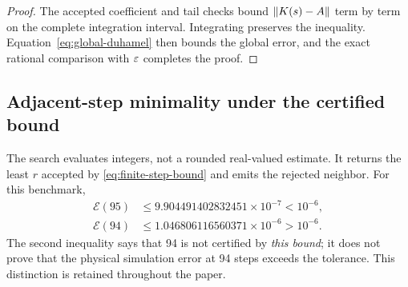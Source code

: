 \begin{proof}
The accepted coefficient and tail checks bound
$\left\lVert K(s)-A\right\rVert$ term by term on the complete integration interval.
Integrating preserves the inequality.  Equation~\eqref{eq:global-duhamel}
then bounds the global error, and the exact rational comparison with $\varepsilon$
completes the proof.
\end{proof}

\subsection{Adjacent-step minimality under the certified bound}

The search evaluates integers, not a rounded real-valued estimate.  It returns
the least $r$ accepted by \cref{eq:finite-step-bound} and emits the rejected
neighbor.  For this benchmark,
\begin{align}
 \mathcal E(95)&\leq9.904491402832451\times10^{-7}<10^{-6},\\
 \mathcal E(94)&\leq1.046806116560371\times10^{-6}>10^{-6}.
\end{align}
The second inequality says that 94 is not certified by \emph{this bound}; it
does not prove that the physical simulation error at 94 steps exceeds the
tolerance.  This distinction is retained throughout the paper.
